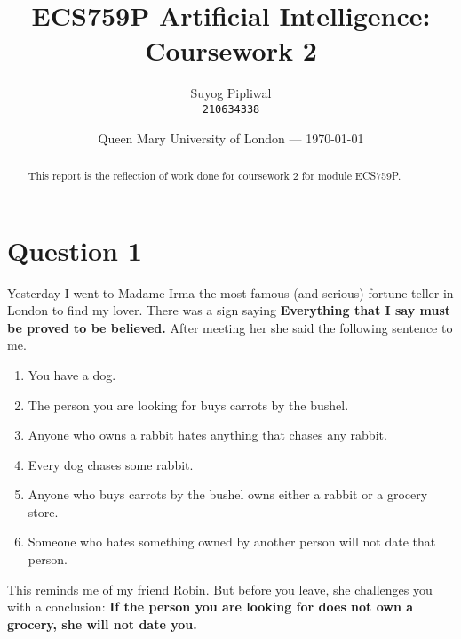 \documentclass[11pt]{article}
\title{ECS759P Artificial Intelligence: Coursework 2} %
\author{Suyog Pipliwal\\ \texttt{210634338}} %
\date{Queen Mary University of London --- \today} %
\begin{document}
	\maketitle
\begin{abstract}
	This report is the reflection of work done for coursework 2 for module ECS759P. 
\end{abstract}
\section*{Question 1}
Yesterday I went to Madame Irma the most famous (and serious) fortune teller in London to find my lover. There was a sign saying \textbf{Everything that I say must be proved to be believed.} After meeting her she said the following sentence to me. 
\begin{enumerate}
	\item You have a dog.
	\item The person you are looking for buys carrots by the bushel.
	\item Anyone who owns a rabbit hates anything that chases any rabbit.
	\item Every dog chases some rabbit.
	\item Anyone who buys carrots by the bushel owns either a rabbit or a grocery store.
	\item Someone who hates something owned by another person will not date that person.
\end{enumerate}
This reminds me of my friend Robin. But before you leave, she challenges you with a conclusion: \textbf{If the person you are looking for does not own a grocery, she will not date you.}\newline
\end{document}
